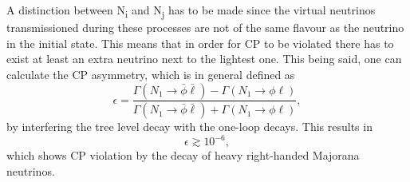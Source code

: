 A distinction between N\textsubscript{i} and N\textsubscript{j} has to be made since the virtual neutrinos transmissioned during these processes are not of the same flavour as the neutrino in the initial state. This means that in order for CP to be violated there has to exist at least an extra neutrino next to the lightest one. \newline\indent
This being said, one can calculate the CP asymmetry\cite[pp. 24ff.]{Davidson:2008bu}, which is in general defined as
\begin{equation}
	\epsilon=\frac{\Gamma(N_1\rightarrow\bar{\phi}\bar{\ell})-\Gamma(N_1\rightarrow\phi\ell)}{\Gamma(N_1\rightarrow\bar{\phi}\bar{\ell})+\Gamma(N_1\rightarrow\phi\ell)},
	\label{eq:CP_violation}
\end{equation}
by interfering the tree level decay with the one-loop decays. This results in \cite[p. 26]{Davidson:2008bu}
\begin{equation}
	\epsilon\gtrsim10^{-6},
	\label{eq:CP_value}
\end{equation}
which shows CP violation by the decay of heavy right-handed Majorana neutrinos. 
